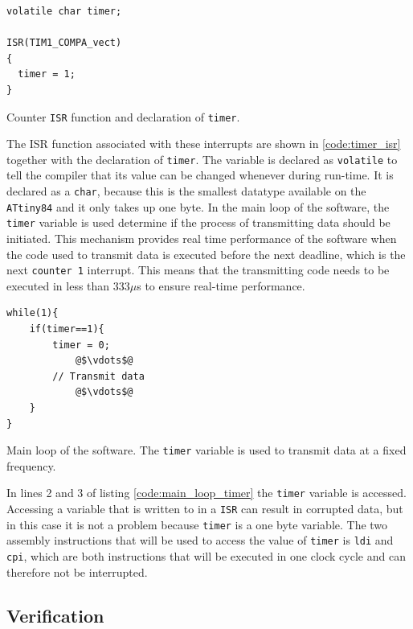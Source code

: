 {\begin{listing}[H] 
\begin{verbatim}
volatile char timer;

ISR(TIM1_COMPA_vect)
{ 
  timer = 1;
}
\end{verbatim}
\caption{Counter \texttt{ISR} function and declaration of \texttt{timer}.}
\label{code:timer_isr}
\end{listing}

The ISR function associated with these interrupts are shown in \ref{code:timer_isr} together with the declaration of \texttt{timer}.
The variable is declared as \texttt{volatile} to tell the compiler that its value can be changed whenever during run-time. 
It is declared as a \texttt{char}, because this is the smallest datatype available on the \texttt{ATtiny84} and it only takes up one byte. 
In the main loop of the software, the \texttt{timer} variable is used determine if the process of transmitting data should be initiated.
This mechanism provides real time performance of the software when the code used to transmit data is executed before the next deadline, which is the next \texttt{counter 1} interrupt.
This means that the transmitting code needs to be executed in less than 333$\mu$s to ensure real-time performance.

\begin{listing}[H] 
\begin{verbatim}
while(1){
    if(timer==1){ 
      	timer = 0;
      		@$\vdots$@
      	// Transmit data
			@$\vdots$@      
	}
}
\end{verbatim}
\caption{Main loop of the software. The \texttt{timer} variable is used to transmit data at a fixed frequency.} 
\label{code:main_loop_timer}
\end{listing}
In lines 2 and 3 of listing \ref{code:main_loop_timer} the \texttt{timer} variable is accessed.  
Accessing a variable that is written to in a \texttt{ISR} can result in corrupted data, but in this case it is not a problem because \texttt{timer} is a one byte variable. 
The two assembly instructions that will be used to access the value of \texttt{timer} is \texttt{ldi} and \texttt{cpi}, which are both instructions that will be executed in one clock cycle and can therefore not be interrupted.

\subsection{Verification} %
\label{sub:verification}


}
